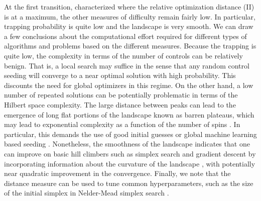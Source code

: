 \documentclass[aps, twocolumn,superscriptaddress]{revtex4-1}
\begin{document}
At the first transition, characterized where the relative optimization distance (II) is at a maximum, the other measures of difficulty remain fairly low. In particular, trapping probability is quite low and the landscape is very smooth. We can draw a few conclusions about the computational effort required for different types of algorithms and problems based on the different measures. Because the trapping is quite low, the complexity in terms of the number of controls can be relatively benign. That is, a local search may suffice in the sense that any random control seeding will converge to a near optimal solution with high probability.  This discounts the need for global optimizers in this regime. On the other hand, a low number of repeated solutions can be potentially problematic in terms of the Hilbert space complexity. The large distance between peaks can lead to the emergence of long flat portions of the landscape known as barren plateaus, which may lead to exponential complexity as a function of the number of spins \cite{mcclean2018barren}. In particular, this demands the use of good initial guesses or global machine learning based seeding \cite{dalgaard2020global}. Nonetheless, the smoothness of the landscape indicates that one can improve on basic hill climbers such as simplex search and gradient descent by incorporating information about the curvature of the landscape \cite{dalgaard2020hessian}, with potentially near quadratic improvement in the convergence.  Finally, we note that the distance measure can be used to tune common hyperparameters, such as the size of the initial simplex in Nelder-Mead simplex search \cite{nelder1965simplex}.
\end{document}
